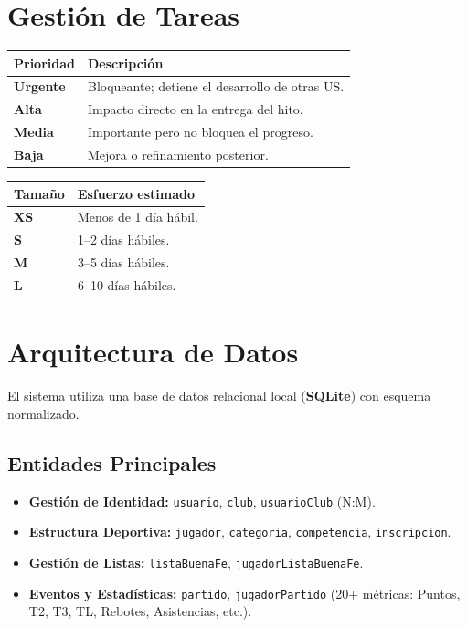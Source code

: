 \documentclass[11pt,a4paper]{article}
\newcommand{\fpath}[1]{\texttt{\small #1}}
\begin{document}
\section{Gestión de Tareas}

\begin{tabular}{@{}lp{10cm}@{}}
\toprule
\rowcolor{headergray}
\textbf{Prioridad} & \textbf{Descripción} \\
\midrule
\textbf{Urgente} & Bloqueante; detiene el desarrollo de otras US. \\
\rowcolor{headergray}
\textbf{Alta}    & Impacto directo en la entrega del hito. \\
\textbf{Media}   & Importante pero no bloquea el progreso. \\
\rowcolor{headergray}
\textbf{Baja}    & Mejora o refinamiento posterior. \\
\bottomrule
\end{tabular}

\vspace{8pt}

\begin{tabular}{@{}lp{10cm}@{}}
\toprule
\rowcolor{headergray}
\textbf{Tamaño} & \textbf{Esfuerzo estimado} \\
\midrule
\textbf{XS} & Menos de 1 día hábil. \\
\rowcolor{headergray}
\textbf{S}  & 1–2 días hábiles. \\
\textbf{M}  & 3–5 días hábiles. \\
\rowcolor{headergray}
\textbf{L}  & 6–10 días hábiles. \\
\bottomrule
\end{tabular}

\section{Arquitectura de Datos}

El sistema utiliza una base de datos relacional local (\textbf{SQLite}) con esquema normalizado.

\subsection{Entidades Principales}
\begin{itemize}[nosep]
  \item \textbf{Gestión de Identidad:} \fpath{usuario}, \fpath{club}, \fpath{usuarioClub} (N:M).
  \item \textbf{Estructura Deportiva:} \fpath{jugador}, \fpath{categoria}, \fpath{competencia}, \fpath{inscripcion}.
  \item \textbf{Gestión de Listas:} \fpath{listaBuenaFe}, \fpath{jugadorListaBuenaFe}.
  \item \textbf{Eventos y Estadísticas:} \fpath{partido}, \fpath{jugadorPartido} (20+ métricas: Puntos, T2, T3, TL, Rebotes, Asistencias, etc.).
\end{itemize}
\end{document}
